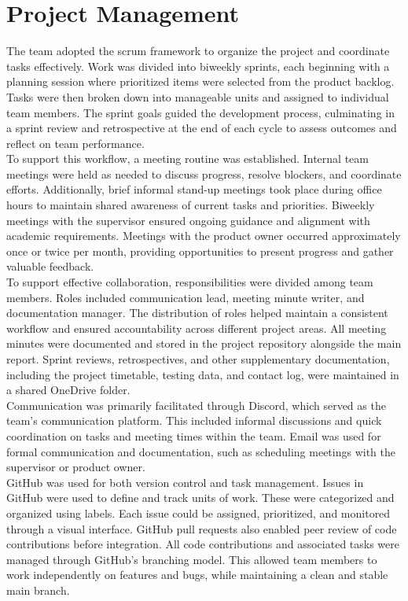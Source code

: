 \newpage

\section{Project Management}
\label{sec:methods-project-management}
The team adopted the \gls{scrum} framework to organize the project and coordinate tasks effectively. Work was divided into biweekly sprints, each beginning with a planning session where prioritized items were selected from the product backlog. Tasks were then broken down into manageable units and assigned to individual team members. The sprint goals guided the development process, culminating in a sprint review and retrospective at the end of each cycle to assess outcomes and reflect on team performance. \\

To support this workflow, a meeting routine was established. Internal team meetings were held as needed to discuss progress, resolve blockers, and coordinate efforts. Additionally, brief informal stand-up meetings took place during office hours to maintain shared awareness of current tasks and priorities. Biweekly meetings with the supervisor ensured ongoing guidance and alignment with academic requirements. Meetings with the product owner occurred approximately once or twice per month, providing opportunities to present progress and gather valuable feedback. \\

To support effective collaboration, responsibilities were divided among team members. Roles included communication lead, meeting minute writer, and documentation manager. The distribution of roles helped maintain a consistent workflow and ensured accountability across different project areas. All meeting minutes were documented and stored in the project repository alongside the main report. Sprint reviews, retrospectives, and other supplementary documentation, including the project timetable, testing data, and contact log, were maintained in a shared OneDrive folder. \\

Communication was primarily facilitated through Discord, which served as the team's communication platform. This included informal discussions and quick coordination on tasks and meeting times within the team. Email was used for formal communication and documentation, such as scheduling meetings with the supervisor or product owner. \\

GitHub was used for both version control and task management. Issues in GitHub were used to define and track units of work. These were categorized and organized using labels. Each issue could be assigned, prioritized, and monitored through a visual interface. GitHub pull requests also enabled peer review of code contributions before integration. All code contributions and associated tasks were managed through GitHub's branching model. This allowed team members to work independently on features and bugs, while maintaining a clean and stable main branch. \\

